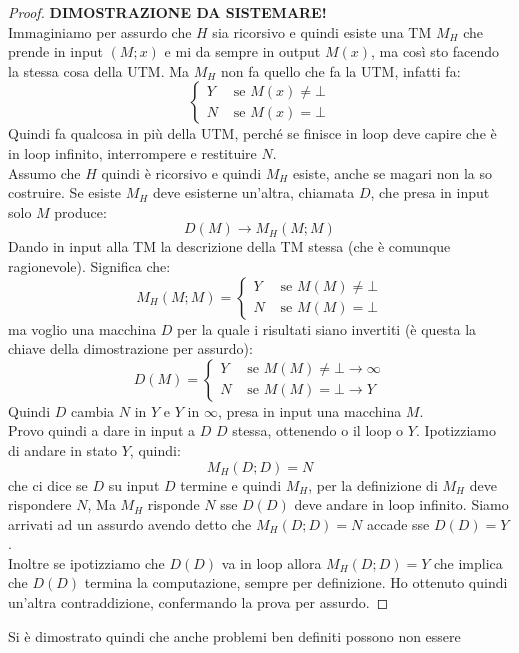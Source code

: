\documentclass[a4paper,12pt, oneside]{book}
\begin{document}
\begin{proof}
  \textbf{DIMOSTRAZIONE DA SISTEMARE!}\\
  Immaginiamo per assurdo che $H$ sia ricorsivo e quindi esiste una TM $M_H$ che
  prende in input $(M;x)$ e mi da sempre in output $M(x)$, ma così sto facendo
  la stessa cosa della UTM. Ma $M_H$ non fa quello che fa la UTM, infatti fa:
  \[
    \begin{cases}
      Y& \mbox{ se }M(x)\neq \bot\\
      N& \mbox{ se }M(x) = \bot
    \end{cases}
  \]
  Quindi fa qualcosa in più della UTM, perché se finisce in loop deve capire che
  è in loop infinito, interrompere e restituire $N$.\\
  Assumo che $H$ quindi è ricorsivo e quindi $M_H$ esiste, anche se magari non
  la so costruire. Se esiste $M_H$ deve esisterne un'altra, chiamata $D$, che
  presa in input solo $M$ produce:
  \[D(M)\to M_H(M;M)\]
  Dando in input alla TM la descrizione della TM stessa (che è comunque
  ragionevole). Significa che:
  \[M_H(M;M)=
    \begin{cases}
      Y& \mbox{ se }M(M)\neq \bot\\
      N& \mbox{ se }M(M)=\bot
    \end{cases}
  \]
  ma voglio una macchina $D$ per la quale i risultati siano invertiti (è questa
  la chiave della dimostrazione per assurdo):
  \[D(M)=
    \begin{cases}
      Y& \mbox{ se }M(M)\neq \bot\to\infty\\
      N& \mbox{ se }M(M)=\bot\to Y
    \end{cases}
  \]
  Quindi $D$ cambia $N$ in $Y$ e $Y$ in $\infty$, presa in input una macchina
  $M$.\\
  Provo quindi a dare in input a $D$ $D$ stessa, ottenendo o il loop o
  $Y$. Ipotizziamo di andare in stato $Y$, quindi:
  \[M_H(D;D)=N\]
  che ci dice se $D$ su input $D$ termine e quindi $M_H$, per la definizione di
  $M_H$ deve rispondere $N$, Ma $M_H$ risponde $N$ sse $D(D)$ deve andare in
  loop infinito. Siamo arrivati ad un assurdo avendo detto che $M_H(D;D)=N$
  accade sse $D(D)=Y$. \\
  Inoltre se ipotizziamo che $D(D)$ va in loop allora $M_H(D;D)=Y$ che implica
  che $D(D)$ termina la computazione, sempre per definizione. Ho ottenuto quindi
  un'altra contraddizione, confermando la prova per assurdo.
\end{proof}
Si è dimostrato quindi che anche problemi ben definiti possono non essere
\end{document}
